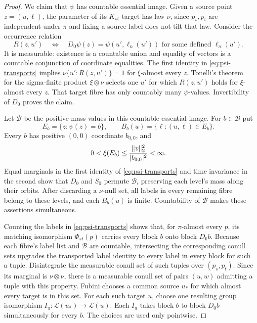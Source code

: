 \begin{proof}
We claim that $\psi$ has countable essential image. Given a source
point $z=(u,\ell)$, the parameter of its $K_{st}$ target has law
$\nu$, since $p_s,p_t$ are independent under $\pi$ and fixing a
source label does not tilt that law. Consider the occurrence relation
\[
 R(z,u')\quad\Longleftrightarrow\quad
 D_0\psi(z)=\psi(u',\ell_n(u'))
 \text{ for some defined }\ell_n(u').
\]
It is measurable: existence is a countable union and equality of
vectors is a countable conjunction of coordinate equalities.
The first identity in \eqref{eq:psi-transports} implies
$\nu\{u':R(z,u')\}=1$ for $\xi$-almost every $z$.
Tonelli's theorem for the sigma-finite product $\xi\otimes\nu$
selects one $u'$ for which $R(z,u')$ holds for $\xi$-almost every
$z$. That target fibre has only countably many $\psi$-values.
Invertibility of $D_0$ proves the claim.

Let $\mathcal B$ be the positive-mass values in this countable
essential image. For $b\in\mathcal B$ put
\[
 E_b=\{z:\psi(z)=b\},\qquad
 B_b(u)=\{\ell:(u,\ell)\in E_b\}.
\]
Every $b$ has positive $(0,0)$ coordinate $b_{0,0}$, and
\begin{equation}\label{eq:finite-level-mass}
 0<\xi(E_b)\le \frac{\lVert v\rVert_2^2}{|b_{0,0}|^2}<\infty.
\end{equation}
Equal marginals in the first identity of \eqref{eq:psi-transports}
and time invariance in the second show that $D_0$ and $S_0$ permute
$\mathcal B$, preserving each level's mass along their orbits.
After discarding a $\nu$-null set, all labels in every remaining
fibre belong to these levels, and each $B_b(u)$ is finite.
Countability of $\mathcal B$ makes these assertions simultaneous.

Counting the labels in \eqref{eq:psi-transports} shows that, for
$\pi$-almost every $p$, its matching isomorphism $\Phi_{st}(p)$
carries every block $b$ onto block $D_0b$.
Because each fibre's label list and $\mathcal B$ are countable,
intersecting the corresponding conull sets upgrades the transported
label identity to every label in every block for such a tuple.
Disintegrate the measurable conull set of such tuples over
$(p_s,p_t)$. Since its marginal is $\nu\otimes\nu$, there is a
measurable conull set of pairs $(u,w)$ admitting a tuple with this
property. Fubini chooses a common source $u_*$ for which almost every
target is in this set. For each such target $u$, choose one resulting
group isomorphism
$I_u:\mathcal L(u_*)\to\mathcal L(u)$.
Each $I_u$ takes block $b$ to block $D_0b$ simultaneously for every
$b$. The choices are used only pointwise.


\end{proof}
